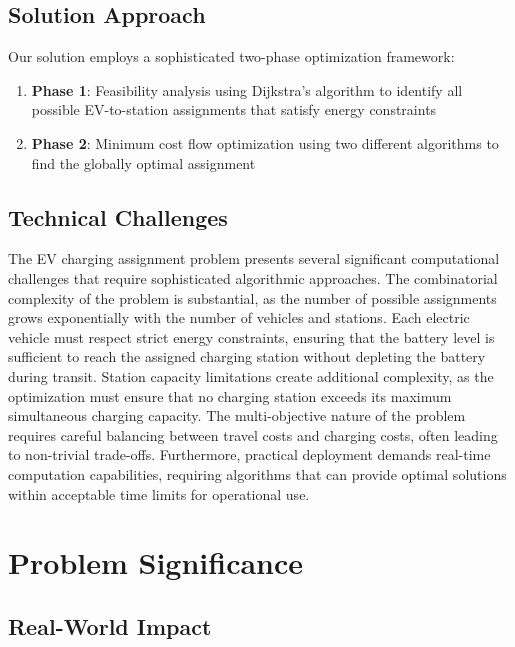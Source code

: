 \documentclass[12pt,a4paper]{article}
\begin{document}
\subsection{Solution Approach}

Our solution employs a sophisticated two-phase optimization framework:
\begin{enumerate}
    \item \textbf{Phase 1}: Feasibility analysis using Dijkstra's algorithm to identify all possible EV-to-station assignments that satisfy energy constraints
    \item \textbf{Phase 2}: Minimum cost flow optimization using two different algorithms to find the globally optimal assignment
\end{enumerate}

\subsection{Technical Challenges}

The EV charging assignment problem presents several significant computational challenges that require sophisticated algorithmic approaches. The combinatorial complexity of the problem is substantial, as the number of possible assignments grows exponentially with the number of vehicles and stations. Each electric vehicle must respect strict energy constraints, ensuring that the battery level is sufficient to reach the assigned charging station without depleting the battery during transit. Station capacity limitations create additional complexity, as the optimization must ensure that no charging station exceeds its maximum simultaneous charging capacity. The multi-objective nature of the problem requires careful balancing between travel costs and charging costs, often leading to non-trivial trade-offs. Furthermore, practical deployment demands real-time computation capabilities, requiring algorithms that can provide optimal solutions within acceptable time limits for operational use.

\section{Problem Significance}

\subsection{Real-World Impact}
\end{document}
